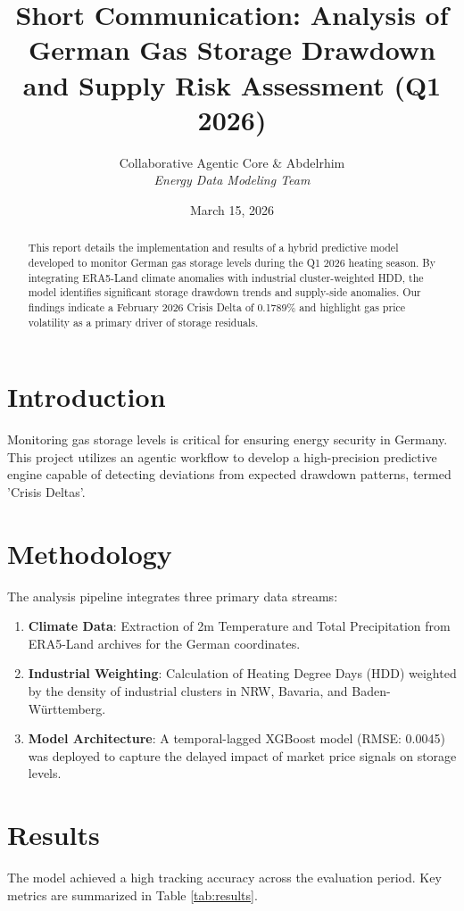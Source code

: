 \documentclass[11pt,a4paper,oneside]{article}
\title{Short Communication: Analysis of German Gas Storage Drawdown and Supply Risk Assessment (Q1 2026)}
\author{Collaborative Agentic Core \& Abdelrhim \\ \textit{Energy Data Modeling Team}}
\date{March 15, 2026}
\begin{document}
\maketitle

\begin{abstract}
This report details the implementation and results of a hybrid predictive model developed to monitor German gas storage levels during the Q1 2026 heating season. By integrating ERA5-Land climate anomalies with industrial cluster-weighted HDD, the model identifies significant storage drawdown trends and supply-side anomalies. Our findings indicate a February 2026 Crisis Delta of 0.1789\% and highlight gas price volatility as a primary driver of storage residuals.
\end{abstract}

\section{Introduction}
Monitoring gas storage levels is critical for ensuring energy security in Germany. This project utilizes an agentic workflow to develop a high-precision predictive engine capable of detecting deviations from expected drawdown patterns, termed 'Crisis Deltas'.

\section{Methodology}
The analysis pipeline integrates three primary data streams:
\begin{enumerate}
    \item \textbf{Climate Data}: Extraction of 2m Temperature and Total Precipitation from ERA5-Land archives for the German coordinates.
    \item \textbf{Industrial Weighting}: Calculation of Heating Degree Days (HDD) weighted by the density of industrial clusters in NRW, Bavaria, and Baden-Württemberg.
    \item \textbf{Model Architecture}: A temporal-lagged XGBoost model (RMSE: 0.0045) was deployed to capture the delayed impact of market price signals on storage levels.
\end{enumerate}

\section{Results}
The model achieved a high tracking accuracy across the evaluation period. Key metrics are summarized in Table \ref{tab:results}.
\end{document}
